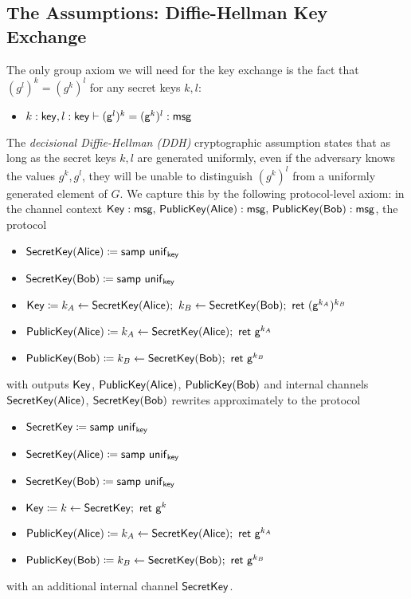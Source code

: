 \subsection{The Assumptions: Diffie-Hellman Key Exchange}
The only group axiom we will need for the key exchange is the fact that $(g^l)^k = (g^k)^l$ for any secret keys $k,l$:
\begin{itemize}
\item $k : \mathsf{key}, l : \mathsf{key} \vdash (\mathsf{g}^l)^k = (\mathsf{g}^k)^l : \mathsf{msg}$
\end{itemize}
The \emph{decisional Diffie-Hellman (DDH)} cryptographic assumption states that as long as the secret keys $k, l$ are generated uniformly, even if the adversary knows the values $g^k, g^l$, they will be unable to distinguish $(g^k)^l$ from a uniformly generated element of $G$. We capture this by the following protocol-level axiom: in the channel context $\mathsf{Key} : \mathsf{msg}, \, \mathsf{PublicKey}(\mathsf{Alice}) : \mathsf{msg}, \, \mathsf{PublicKey}(\mathsf{Bob}) : \mathsf{msg}$, the protocol
\begin{itemize}
\item $\mathsf{SecretKey}(\mathsf{Alice}) \coloneqq \mathsf{samp} \ \mathsf{unif}_{\mathsf{key}}$
\item $\mathsf{SecretKey}(\mathsf{Bob}) \coloneqq \mathsf{samp} \ \mathsf{unif}_{\mathsf{key}}$
\item $\Key \coloneqq k_A \leftarrow \SecretKey(\Alice); \ k_B \leftarrow \SecretKey(\Bob); \ \ret{(\gen^{k_A})^{k_B}}$
\item $\mathsf{PublicKey}(\mathsf{Alice}) \coloneqq k_A \leftarrow \mathsf{SecretKey}(\mathsf{Alice}); \ \mathsf{ret} \ \mathsf{g}^{k_A}$
\item $\mathsf{PublicKey}(\mathsf{Bob}) \coloneqq k_B \leftarrow \mathsf{SecretKey}(\mathsf{Bob}); \ \mathsf{ret} \ \mathsf{g}^{k_B}$
\end{itemize}
with outputs $\mathsf{Key}$, $\mathsf{PublicKey}(\mathsf{Alice})$, $\mathsf{PublicKey}(\mathsf{Bob})$ and internal channels $\mathsf{SecretKey}(\mathsf{Alice})$, $\mathsf{SecretKey}(\mathsf{Bob})$ rewrites approximately to the protocol
\begin{itemize}
\item {\color{red} $\mathsf{SecretKey} \coloneqq \mathsf{samp} \ \mathsf{unif}_{\mathsf{key}}$}
\item $\mathsf{SecretKey}(\mathsf{Alice}) \coloneqq \mathsf{samp} \ \mathsf{unif}_{\mathsf{key}}$
\item $\mathsf{SecretKey}(\mathsf{Bob}) \coloneqq \mathsf{samp} \ \mathsf{unif}_{\mathsf{key}}$
\item {\color{red} $\mathsf{Key} \coloneqq k \leftarrow \mathsf{SecretKey}; \ \mathsf{ret} \ \mathsf{g}^k$}
\item $\mathsf{PublicKey}(\mathsf{Alice}) \coloneqq k_A \leftarrow \mathsf{SecretKey}(\mathsf{Alice}); \ \mathsf{ret} \ \mathsf{g}^{k_A}$
\item $\mathsf{PublicKey}(\mathsf{Bob}) \coloneqq k_B \leftarrow \mathsf{SecretKey}(\mathsf{Bob}); \ \mathsf{ret} \ \mathsf{g}^{k_B}$
\end{itemize}
with an additional internal channel $\mathsf{SecretKey}$.


